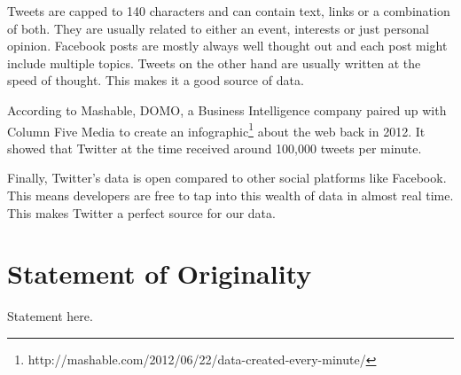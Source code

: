 Tweets are capped to 140 characters and can contain text, links or a combination of both. They are
usually related to either an event, interests or just personal opinion. Facebook posts are mostly
always well thought out and each post might include multiple topics. Tweets on the other hand are
usually written at the speed of thought. This makes it a good source of data.

According to Mashable, DOMO, a Business Intelligence company paired up with Column Five Media to
create an infographic\footnote{http://mashable.com/2012/06/22/data-created-every-minute/} about the
web back in 2012. It showed that Twitter at the time received around 100,000 tweets per minute.

Finally, Twitter's data is open compared to other social platforms like Facebook. This means
developers are free to tap into this wealth of data in almost real time. This makes Twitter a
perfect source for our data.

\section{Statement of Originality}

Statement here.

